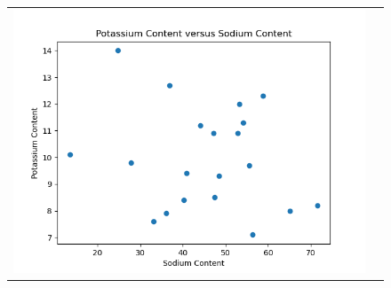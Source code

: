 \begin{enumerate}[label=(\alph*)]
\begin{figure}[H]
\begin{tabular}{cc}
            \includegraphics[scale=0.325]{./python/chapter-5/Exercise-5-4-Sodium-vs-Potassium.png}
        \end{tabular}
    \end{figure}

\end{enumerate}